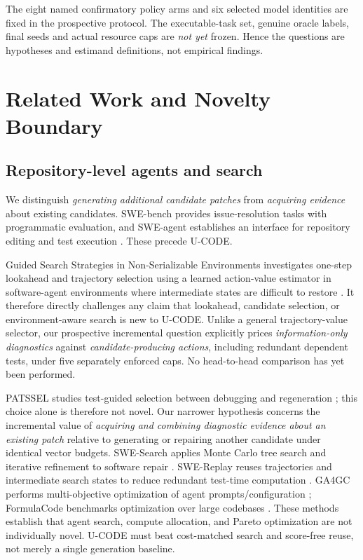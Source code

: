 \documentclass[pdflatex,sn-basic]{sn-jnl}
\begin{document}
The eight named confirmatory policy arms and six selected
model identities are fixed in the prospective protocol.
The executable-task set, genuine oracle labels, final seeds
and actual resource caps are \emph{not yet} frozen. Hence
the questions are hypotheses and estimand definitions,
not empirical findings.

\section{Related Work and Novelty Boundary}\label{sec:related}

\subsection{Repository-level agents and search}
We distinguish \emph{generating additional candidate patches} from
\emph{acquiring evidence} about existing candidates. SWE-bench provides
issue-resolution tasks with programmatic evaluation, and SWE-agent
establishes an interface for repository editing and test execution
\cite{jimenez2024swebench,yang2024sweagent}. These precede U-CODE.

Guided Search Strategies in Non-Serializable Environments
investigates one-step lookahead and trajectory selection using a
learned action-value estimator in software-agent environments
where intermediate states are difficult to restore
\cite{zainullina2025guided}. It therefore directly challenges
any claim that lookahead, candidate selection, or
environment-aware search is new to U-CODE. Unlike a
general trajectory-value selector, our prospective
incremental question explicitly prices
\emph{information-only diagnostics} against
\emph{candidate-producing actions}, including redundant
dependent tests, under five separately enforced caps.
No head-to-head comparison has yet been performed.

PATSSEL studies test-guided selection between debugging and
regeneration \cite{kulkarni2026pats}; this choice alone is
therefore not novel. Our narrower hypothesis concerns the
incremental value of \emph{acquiring and combining diagnostic
evidence about an existing patch} relative to generating or
repairing another candidate under identical vector budgets.
SWE-Search applies Monte Carlo tree search and iterative refinement
to software repair \cite{antoniades2025swesearch}. SWE-Replay reuses
trajectories and intermediate search states to reduce redundant
test-time computation \cite{ding2026swereplay}. GA4GC performs
multi-objective optimization of agent prompts/configuration
\cite{gong2025ga4gc}; FormulaCode benchmarks optimization over
large codebases \cite{sehgal2026formulacode}. These methods
establish that agent search, compute allocation, and Pareto
optimization are not individually novel. U-CODE must beat
cost-matched search and score-free reuse, not merely a single
generation baseline.
\end{document}
